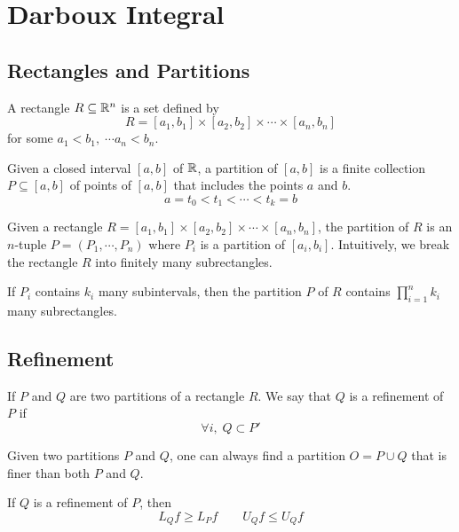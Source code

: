 \section{Darboux Integral}

\subsection{Rectangles and Partitions}
\begin{definition}[Rectangle]
A rectangle $R \subseteq {\mathbb R}^n$ is a set defined by
$$
R = [a_1,b_1] \times [a_2, b_2] \times \cdots \times [a_n, b_n]
$$
for some $a_1<b_1,\;\cdots a_n < b_n$.
\end{definition}

\begin{definition}
Given a closed interval $[a,b]$ of ${\mathbb R}$, a partition of $[a,b]$ is a finite collection $P \subseteq [a,b]$ of points of $[a,b]$ that includes the points $a$ and $b$.
$$
a = t_0 < t_1 < \cdots < t_k = b
$$
\end{definition}

\begin{definition}
Given a rectangle $R = [a_1,b_1] \times [a_2, b_2] \times \cdots \times [a_n, b_n]$, the partition of $R$ is an $n$-tuple $P=(P_1,\cdots,P_n)$ where $P_i$ is a partition of $[a_i,b_i]$. Intuitively, we break the rectangle $R$ into finitely many subrectangles.

If $P_i$ contains $k_i$ many subintervals, then the partition $P$ of $R$ contains $\prod_{i=1}^n k_i$ many subrectangles.
\end{definition}

\subsection{Refinement}

\begin{definition}[Refinement]
If $P$ and $Q$ are two partitions of a rectangle $R$. We say that $Q$ is a refinement of $P$ if
$$
\forall i,\; Q \subset P'
$$
\end{definition}

\begin{lemma}
Given two partitions $P$ and $Q$, one can always find a partition $O = P \cup Q$ that is finer than both $P$ and $Q$.
\end{lemma}

\begin{lemma}
If $Q$ is a refinement of $P$, then
$$
L_Q f \geq L_P f \qquad U_Q f \leq U_Q f
$$
\end{lemma}

